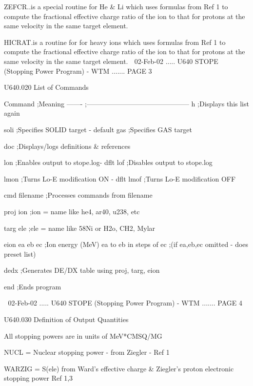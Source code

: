    ZEFCR..is  a  special routine for He & Li which uses formulas from Ref 1 to
          compute the fractional effective charge ratio of  the  ion  to  that
          for protons at the same velocity in the same target element.
 
 
   HICRAT.is  a  routine  for for heavy ions which uses formulas from Ref 1 to
          compute the fractional effective charge ratio of  the  ion  to  that
          for protons at the same velocity in the same target element.
    
   02-Feb-02 ..... U640  STOPE (Stopping Power Program) - WTM ....... PAGE   3
 
 
   U640.020  List of Commands
 
   Command        ;Meaning
   -------        ;---------------------------------------------
   h              ;Displays this list again
 
   soli           ;Specifies SOLID  target - default
   gas            ;Specifies GAS    target
 
   doc            ;Displays/logs definitions & references
 
   lon            ;Enables  output to stope.log- dflt
   lof            ;Disables output to stope.log
 
   lmon           ;Turns Lo-E modification ON - dflt
   lmof           ;Turns Lo-E modification OFF
 
   cmd  filename  ;Processes commands from filename
 
   proj ion       ;ion = name like he4, ar40, u238, etc
 
   targ ele       ;ele = name like 58Ni or H2o, CH2, Mylar
 
   eion ea eb ec  ;Ion energy (MeV) ea to eb in steps of ec
                  ;(if ea,eb,ec omitted - does preset list)
 
   dedx           ;Generates DE/DX table using proj, targ, eion
 
   end            ;Ends program
 
    
   02-Feb-02 ..... U640  STOPE (Stopping Power Program) - WTM ....... PAGE   4
 
 
   U640.030  Definition of Output Quantities
 
   All stopping powers are in units of MeV*CMSQ/MG
 
   NUCL   = Nuclear stopping power - from Ziegler - Ref 1
 
   WARZIG = S(ele) from Ward's effective charge & Ziegler's proton electronic
            stopping power Ref 1,3
 
